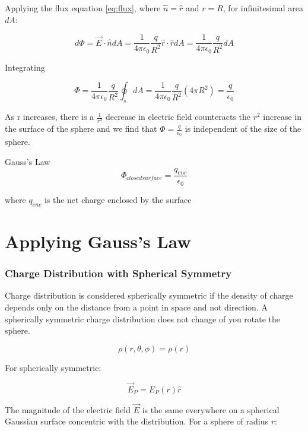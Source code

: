 \documentclass[14pt]{memoir}
\begin{document}
Applying the flux equation \ref{eq:flux}, where $\hat{n} = \hat{r}$ and $r = R$, for infinitesimal area $dA$:

\begin{equation}
d\Phi = \vec{E} \cdot \hat{n} dA = \frac{1}{4 \pi \epsilon_0} \frac{q}{R^2} \hat{r} \cdot \hat{r} dA =  \frac{1}{4 \pi \epsilon_0} \frac{q}{R^2} dA
\end{equation}

Integrating

\begin{equation}
\Phi = \frac{1}{4 \pi \epsilon_0} \frac{q}{R^2} \oint_s dA =  \frac{1}{4 \pi \epsilon_0} \frac{q}{R^2} (4 \pi R^2) = \frac{q}{\epsilon_0}
\end{equation}

As r increases, there is a  $\frac{1}{r^2}$ decrease in electric field counteracts the $r^2$ increase in the surface of the sphere and we find that $\Phi = \frac{q}{\epsilon_0}$ is independent of the size of the sphere. 


Gauss's Law
\begin{equation}
\boxed{\Phi_{closedsurface} = \frac{q_{enc}}{\epsilon_0}}
\end{equation}

where $q_{enc}$ is the net charge enclosed by the surface

\section{Applying Gauss's Law}

\subsubsection{Charge Distribution with Spherical Symmetry}

Charge distribution is considered spherically symmetric if the density of charge depends only on the distance from a point in space and not direction. A spherically symmetric charge distribution does not change of you rotate the sphere.

\begin{equation}
\rho(r,\theta,\phi) = \rho(r)
\end{equation}

For spherically symmetric:

\begin{equation}
\vec{E}_P = E_P(r)\hat{r}
\end{equation}

The magnitude of the electric field $\vec{E}$ is the same everywhere on a spherical Gaussian surface concentric with the distribution. For a sphere of radius $r$:
\end{document}
